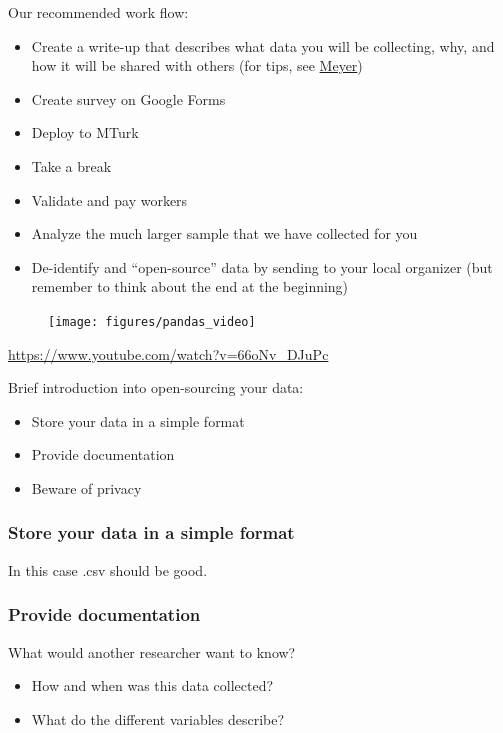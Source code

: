 \documentclass[aspectratio=169]{beamer}
\begin{document}
\begin{frame}

Our recommended work flow:
\begin{itemize}
\item Create a write-up that describes what data you will be collecting, why, and how it will be shared with others (for tips, see \href{https://doi.org/10.1177/2515245917747656}{Meyer})
\item Create survey on Google Forms
\item Deploy to MTurk
\item Take a break
\item Validate and pay workers
\item Analyze the much larger sample that we have collected for you
\item De-identify and ``open-source'' data by sending to your local organizer (but remember to think about the end at the beginning)
\end{itemize}

\end{frame}
\begin{frame}

\begin{figure}
  \centering
  \texttt{[image: figures/pandas\_video]}
\end{figure}

\url{https://www.youtube.com/watch?v=66oNv_DJuPc}

\end{frame}
\begin{frame}

Brief introduction into open-sourcing your data:
\begin{itemize}
\item Store your data in a simple format
\pause
\item Provide documentation
\pause
\item Beware of privacy
\end{itemize}

\end{frame}
\begin{frame}
\frametitle{Store your data in a simple format}

\pause
In this case .csv should be good.

\end{frame}
\begin{frame}
\frametitle{Provide documentation}

\pause
What would another researcher want to know? 

\begin{itemize}
\item How and when was this data collected?
\item What do the different variables describe?
\end{itemize}

\end{frame}
\end{document}
